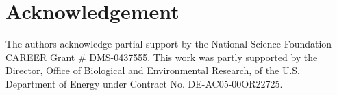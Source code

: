 
\section*{Acknowledgement}

The authors acknowledge partial support by the National Science Foundation
CAREER Grant \# DMS-0437555.
This work was partly supported by the Director, Office of
Biological and Environmental Research, of the U.S. Department of Energy
under Contract No. DE-AC05-00OR22725.
\\
